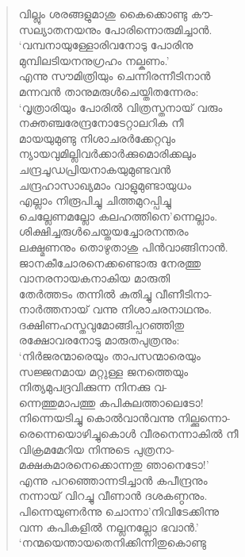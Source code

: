 \begin{verse}
വില്ലും ശരങ്ങളുമാശു കൈക്കൊണ്ടു കൗ-\\
സല്യാതനയനും പോരിന്നൊരുമിച്ചാന്‍.\\
‘വമ്പനായുള്ളോരിവനോടു പോരിനു\\
മുമ്പിലടിയനനുഗ്രഹം നല്കണം.’\\
എന്നു സൗമിത്രിയും ചെന്നിരന്നീടിനാന്‍\\
മന്നവന്‍ താനുമരുള്‍ചെയ്തിതന്നേരം:\\
‘വൃത്രാരിയും പോരില്‍ വിത്രസ്തനായ് വരും\\
നക്തഞ്ചരേന്ദ്രനോടേറ്റാലറിക നീ\\
മായയുമുണ്ടു നിശാചരര്‍ക്കേറ്റവും\\
ന്യായവുമില്ലിവര്‍ക്കാര്‍ക്കുമൊരിക്കലും\\
ചന്ദ്രചൂഡപ്രിയനാകയുമുണ്ടവന്‍\\
ചന്ദ്രഹാസാഖ്യമാം വാളുമുണ്ടായുധം\\
എല്ലാം നിരൂപിച്ചു ചിത്തമുറപ്പിച്ചു\\
ചെല്ലേണമല്ലോ കലഹത്തിനെ’ന്നെല്ലാം.\\
ശിക്ഷിച്ചരുള്‍ചെയ്തയച്ചോരനന്തരം\\
ലക്ഷ്മണനും തൊഴുതാശു പിന്‍വാങ്ങിനാന്‍.\\
ജാനകീചോരനെക്കണ്ടൊരു നേരത്തു\\
വാനരനായകനാകിയ മാരുതി\\
തേര്‍ത്തടം തന്നില്‍ കുതിച്ചു വീണീടിനാ-\\
നാര്‍ത്തനായ് വന്നു നിശാചരനാഥനും.\\
ദക്ഷിണഹസ്തവുമോങ്ങിപ്പറഞ്ഞിതു\\
രക്ഷോവരനോടു മാരുതപുത്രനും:\\
‘നിര്‍ജരന്മാരെയും താപസന്മാരെയും\\
സജ്ജനമായ മറ്റുള്ള ജനത്തെയും\\
നിത്യമുപദ്രവിക്കുന്ന നിനക്കു വ-\\
ന്നെത്തുമാപത്തു കപികുലത്താലെടോ!\\
നിന്നെയടിച്ചു കൊല്‍വാന്‍വന്നു നില്ക്കുന്നൊ-\\
രെന്നെയൊഴിച്ചുകൊള്‍ വീരനെന്നാകില്‍ നീ\\
വിക്രമമേറിയ നിന്നുടെ പുത്രനാ-\\
മക്ഷകുമാരനെക്കൊന്നതു ഞാനെടോ!’\\
എന്നു പറഞ്ഞൊന്നടിച്ചാന്‍ കപീന്ദ്രനും\\
നന്നായ് വിറച്ചു വീണാന്‍ ദശകണ്ഠനും.\\
പിന്നെയുണര്‍ന്നു ചൊന്നാ’നിവിടേക്കിന്നു\\
വന്ന കപികളില്‍ നല്ലനല്ലോ ഭവാന്‍.’\\
‘നന്മയെന്തായതെനിക്കിന്നിതുകൊണ്ടു\\

\end{verse}
